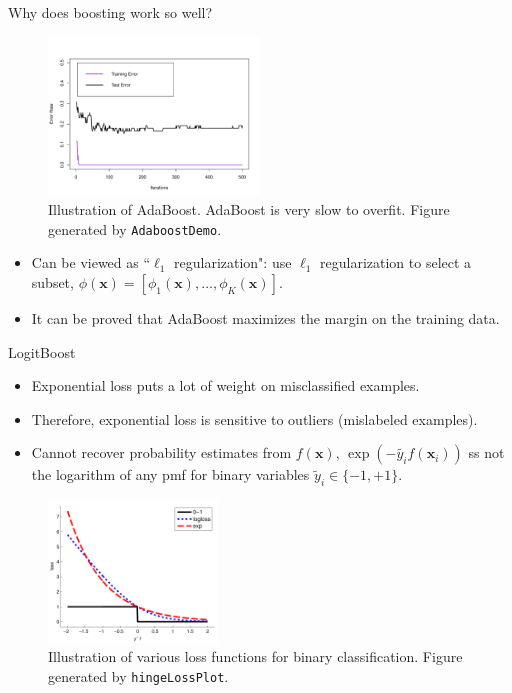 \documentclass[10pt,mathserif]{beamer}
\begin{document}
\begin{frame}{Why does boosting work so well?}
\begin{figure}[h]
\centering
\includegraphics[width=0.5\textwidth]{AdaboostDemo}
\caption{Illustration of AdaBoost. AdaBoost is very slow to overfit. Figure generated by \texttt{AdaboostDemo}.}
\end{figure}
\begin{itemize}
    \item Can be viewed as ``$\ell_1$ regularization": use $\ell_1$ regularization to select a subset, $\phi(\bm{x}) = [\phi_1(\bm{x}),\ldots,\phi_K(\bm{x})]$.
    \item It can be proved that AdaBoost maximizes the margin on the training data.
\end{itemize}    
\end{frame}

\begin{frame}{LogitBoost}
\begin{itemize}
    \item Exponential loss  puts a lot of weight on misclassified examples.
    \item Therefore, exponential loss is sensitive to outliers (mislabeled examples).
    \item Cannot recover probability estimates from $f(\bm{x})$, $\exp(-\tilde{y_i}f(\bm{x}_i))$ ss not the logarithm of any pmf for binary variables $\tilde{y}_i \in \{-1,+1\}$.
\end{itemize}
\begin{figure}[h]
\centering
\includegraphics[width=0.4\textwidth]{expLoss}
\caption{ Illustration of various loss functions for binary classification. Figure generated by \texttt{hingeLossPlot}.}
\end{figure}
\end{frame}
\end{document}
